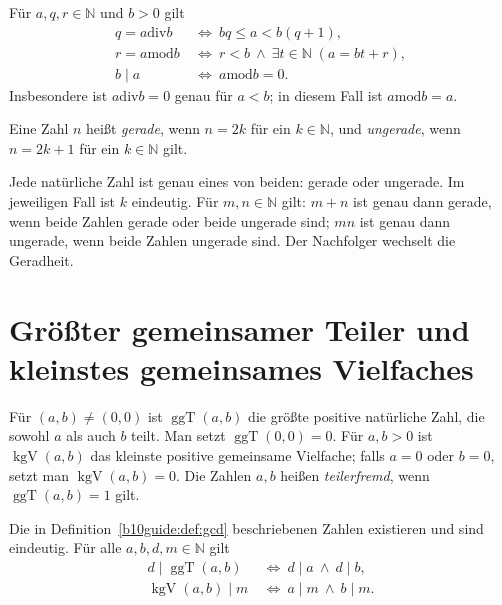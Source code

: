\begin{theorem}
Für $a,q,r\in\mathbb N$ und $b>0$ gilt
\[
\begin{aligned}
 q=a\mathbin{\mathrm{div}}b
 &\ \Longleftrightarrow\ bq\le a<b(q+1),\\
 r=a\mathbin{\mathrm{mod}}b
 &\ \Longleftrightarrow\ r<b\ \land\
       \exists t\in\mathbb N\;(a=bt+r),\\
 b\mid a&\ \Longleftrightarrow\ a\mathbin{\mathrm{mod}}b=0.
\end{aligned}
\]
Insbesondere ist $a\mathbin{\mathrm{div}}b=0$ genau für $a<b$;
in diesem Fall ist $a\mathbin{\mathrm{mod}}b=a$.
\end{theorem}

\begin{definition}
Eine Zahl $n$ heißt \emph{gerade}, wenn $n=2k$ für ein
$k\in\mathbb N$, und \emph{ungerade}, wenn $n=2k+1$ für ein
$k\in\mathbb N$ gilt.
\end{definition}

\begin{theorem}
Jede natürliche Zahl ist genau eines von beiden: gerade oder ungerade.
Im jeweiligen Fall ist $k$ eindeutig. Für $m,n\in\mathbb N$ gilt:
$m+n$ ist genau dann gerade, wenn beide Zahlen gerade oder beide
ungerade sind; $mn$ ist genau dann ungerade, wenn beide Zahlen
ungerade sind. Der Nachfolger wechselt die Geradheit.
\end{theorem}

\section{Größter gemeinsamer Teiler und kleinstes gemeinsames Vielfaches}

\begin{definition}
\label{b10guide:def:gcd}
Für $(a,b)\ne(0,0)$ ist $\operatorname{ggT}(a,b)$ die größte positive
natürliche Zahl, die sowohl $a$ als auch $b$ teilt.
Man setzt $\operatorname{ggT}(0,0)=0$.
Für $a,b>0$ ist $\operatorname{kgV}(a,b)$ das kleinste positive
gemeinsame Vielfache; falls $a=0$ oder $b=0$, setzt man
$\operatorname{kgV}(a,b)=0$.
Die Zahlen $a,b$ heißen \emph{teilerfremd}, wenn
$\operatorname{ggT}(a,b)=1$ gilt.
\end{definition}

\begin{theorem}
Die in Definition~\ref{b10guide:def:gcd} beschriebenen Zahlen
existieren und sind eindeutig. Für alle $a,b,d,m\in\mathbb N$ gilt
\[
\begin{aligned}
 d\mid\operatorname{ggT}(a,b)
 &\ \Longleftrightarrow\ d\mid a\ \land\ d\mid b,\\
 \operatorname{kgV}(a,b)\mid m
 &\ \Longleftrightarrow\ a\mid m\ \land\ b\mid m.
\end{aligned}
\]
\end{theorem}

